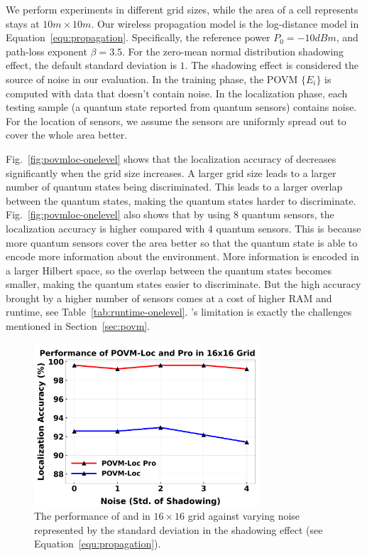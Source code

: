 We perform experiments in different grid sizes, while the area of a cell represents stays at $10m \times 10m$.
Our wireless propagation model is the log-distance model in Equation~\ref{equ:propagation}.
Specifically, the reference power $P_0=-10 dBm$, and path-loss exponent $\beta=3.5$.
For the zero-mean normal distribution shadowing effect, the default standard deviation is $1$.
The shadowing effect is considered the source of noise in our evaluation.
In the training phase, the POVM $\{E_i \}$ is computed with data that doesn't contain noise.
In the localization phase, each testing sample (a quantum state reported from quantum sensors) contains noise.
For the location of sensors, we assume the sensors are uniformly spread out to cover the whole area better.


Fig.~\ref{fig:povmloc-onelevel} shows that the localization accuracy of \povmone decreases significantly when the grid size increases.
A larger grid size leads to a larger number of quantum states being discriminated.
This leads to a larger overlap between the quantum states, making the quantum states harder to discriminate.
Fig.~\ref{fig:povmloc-onelevel} also shows that by using 8 quantum sensors, the localization accuracy is higher compared with 4 quantum sensors.
This is because more quantum sensors cover the area better so that the quantum state is able to encode more information about the environment.
More information is encoded in a larger Hilbert space, so the overlap between the quantum states becomes smaller, making the quantum states easier to discriminate.
But the high accuracy brought by a higher number of sensors comes at a cost of higher RAM and runtime, see Table~\ref{tab:runtime-onelevel}.
\povmone's limitation is exactly the challenges mentioned in Section~\ref{sec:povm}.




\begin{figure}[t]
    \centering
    \includegraphics[width=0.75\textwidth]{chapters/icc/figures/twolevel-varynoise.png}
    \caption{The performance of \povm and \povmpro in $16\times 16$ grid against varying noise represented by the standard deviation in the shadowing effect (see Equation~\ref{equ:propagation}).}
    \label{fig:povmloc}
\end{figure}


